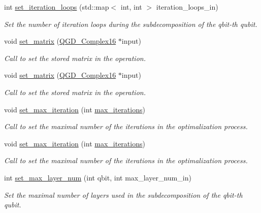 \begin{DoxyCompactItemize}
int \hyperlink{class_decomposition___base_aa376f8cfdb1b9ed06bceff9c72ddf496}{set\+\_\+iteration\+\_\+loops} (std\+::map$<$ int, int $>$ iteration\+\_\+loops\+\_\+in)
\begin{DoxyCompactList}\small\item\em Set the number of iteration loops during the subdecomposition of the qbit-\/th qubit. \end{DoxyCompactList}\item 
void \hyperlink{class_operation_a026d3dcf0ad00af99c7a9097d3cf1c74}{set\+\_\+matrix} (\hyperlink{struct_q_g_d___complex16}{Q\+G\+D\+\_\+\+Complex16} $\ast$input)
\begin{DoxyCompactList}\small\item\em Call to set the stored matrix in the operation. \end{DoxyCompactList}\item 
void \hyperlink{class_operation_a026d3dcf0ad00af99c7a9097d3cf1c74}{set\+\_\+matrix} (\hyperlink{struct_q_g_d___complex16}{Q\+G\+D\+\_\+\+Complex16} $\ast$input)
\begin{DoxyCompactList}\small\item\em Call to set the stored matrix in the operation. \end{DoxyCompactList}\item 
void \hyperlink{class_decomposition___base_a26e98bca148157ec42e5f1618deb50ea}{set\+\_\+max\+\_\+iteration} (int \hyperlink{class_decomposition___base_a89e74f075626c21e23228772bf8ad395}{max\+\_\+iterations})
\begin{DoxyCompactList}\small\item\em Call to set the maximal number of the iterations in the optimalization process. \end{DoxyCompactList}\item 
void \hyperlink{class_decomposition___base_a26e98bca148157ec42e5f1618deb50ea}{set\+\_\+max\+\_\+iteration} (int \hyperlink{class_decomposition___base_a89e74f075626c21e23228772bf8ad395}{max\+\_\+iterations})
\begin{DoxyCompactList}\small\item\em Call to set the maximal number of the iterations in the optimalization process. \end{DoxyCompactList}\item 
int \hyperlink{class_decomposition___base_a6cbee8cd37f42b2fe6bdd6f5c0fd3fdb}{set\+\_\+max\+\_\+layer\+\_\+num} (int qbit, int max\+\_\+layer\+\_\+num\+\_\+in)
\begin{DoxyCompactList}\small\item\em Set the maximal number of layers used in the subdecomposition of the qbit-\/th qubit. \end{DoxyCompactList}\item 

\end{DoxyCompactItemize}
